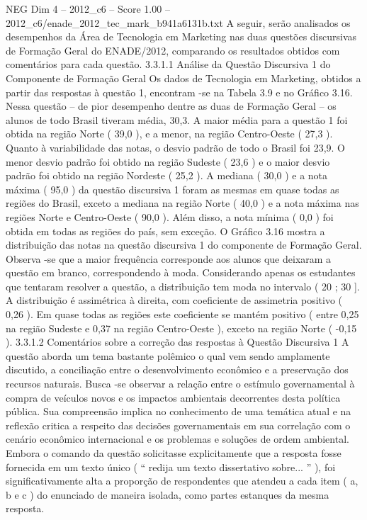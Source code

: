 \begin{textsample}{NEG Dim 4 – 2012\_c6 – Score 1.00 – 2012\_c6/enade\_2012\_tec\_mark\_b941a6131b.txt}
A seguir, serão analisados os desempenhos da Área de Tecnologia em Marketing nas duas questões discursivas de Formação Geral do ENADE/2012, comparando os resultados obtidos com comentários para cada questão. 3.3.1.1 Análise da Questão Discursiva 1 do Componente de Formação Geral Os dados de Tecnologia em Marketing, obtidos a partir das respostas à questão 1, encontram -se na Tabela 3.9 e no Gráfico 3.16.
Nessa questão – de pior desempenho dentre as duas de Formação Geral – os alunos de todo Brasil tiveram média, 30,3.
A maior média para a questão 1 foi obtida na região Norte ( 39,0 ), e a menor, na região Centro-Oeste ( 27,3 ).
Quanto à variabilidade das notas, o desvio padrão de todo o Brasil foi 23,9.
O menor desvio padrão foi obtido na região Sudeste ( 23,6 ) e o maior desvio padrão foi obtido na região Nordeste ( 25,2 ).
A mediana ( 30,0 ) e a nota máxima ( 95,0 ) da questão discursiva 1 foram as mesmas em quase todas as regiões do Brasil, exceto a mediana na região Norte ( 40,0 ) e a nota máxima nas regiões Norte e Centro-Oeste ( 90,0 ).
Além disso, a nota mínima ( 0,0 ) foi obtida em todas as regiões do país, sem exceção.
O Gráfico 3.16 mostra a distribuição das notas na questão discursiva 1 do componente de Formação Geral.
Observa -se que a maior frequência corresponde aos alunos que deixaram a questão em branco, correspondendo à moda.
Considerando apenas os estudantes que tentaram resolver a questão, a distribuição tem moda no intervalo ( 20 ; 30 ].
A distribuição é assimétrica à direita, com coeficiente de assimetria positivo ( 0,26 ).
Em quase todas as regiões este coeficiente se mantém positivo ( entre 0,25 na região Sudeste e 0,37 na região Centro-Oeste ), exceto na região Norte ( -0,15 ). 3.3.1.2 Comentários sobre a correção das respostas à Questão Discursiva 1 A questão aborda um tema bastante polêmico o qual vem sendo amplamente discutido, a conciliação entre o desenvolvimento econômico e a preservação dos recursos naturais.
Busca -se observar a relação entre o estímulo governamental à compra de veículos novos e os impactos ambientais decorrentes desta política pública.
Sua compreensão implica no conhecimento de uma temática atual e na reflexão critica a respeito das decisões governamentais em sua correlação com o cenário econômico internacional e os problemas e soluções de ordem ambiental.
Embora o comando da questão solicitasse explicitamente que a resposta fosse fornecida em um texto único ( “ redija um texto dissertativo sobre... ” ), foi significativamente alta a proporção de respondentes que atendeu a cada item ( a, b e c ) do enunciado de maneira isolada, como partes estanques da mesma resposta.

\end{textsample}
